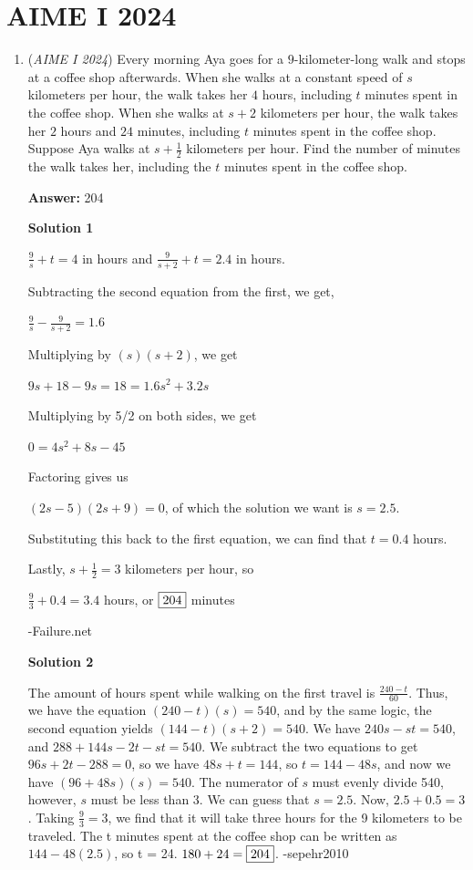 \section{AIME I 2024}
        \begin{enumerate}
        	\item (\textit{AIME I 2024}) Every morning Aya goes for a $9$-kilometer-long walk and stops at a coffee shop afterwards. When she walks at a constant speed of $s$ kilometers per hour, the walk takes her $4$ hours, including $t$ minutes spent in the coffee shop. When she walks at $s + 2$ kilometers per hour, the walk takes her $2$ hours and $24$ minutes, including $t$ minutes spent in the coffee shop. Suppose Aya walks at $s + \frac{1}{2}$
kilometers per hour. Find the number of minutes the walk takes her, including the $t$ minutes spent in the coffee shop.


 
 \textbf{Answer: }204



\textbf{Solution 1}

$\frac{9}{s} + t = 4$ in hours and $\frac{9}{s+2} + t = 2.4$ in hours.

 Subtracting the second equation from the first, we get, 

 $\frac{9}{s} - \frac{9}{s+2} = 1.6$

 Multiplying by $(s)(s+2)$, we get 

 $9s+18-9s=18=1.6s^{2} + 3.2s$

 Multiplying by 5/2 on both sides, we get

 $0 = 4s^{2} + 8s - 45$

 Factoring gives us 

 $(2s-5)(2s+9) = 0$, of which the solution we want is $s=2.5$.

 Substituting this back to the first equation, we can find that $t = 0.4$ hours.

 Lastly, $s + \frac{1}{2} = 3$ kilometers per hour, so

 $\frac{9}{3} + 0.4 = 3.4$ hours, or $\framebox{204}$ minutes

 -Failure.net

 



\textbf{Solution 2}

The amount of hours spent while walking on the first travel is $\frac{240-t}{60}$. Thus, we have the equation $(240-t)(s) = 540$, and by the same logic, the second equation yields $(144-t)(s+2) = 540$. We have $240s-st = 540$, and $288+144s-2t-st = 540$. We subtract the two equations to get $96s+2t-288 = 0$, so we have $48s+t = 144$, so $t = 144-48s$, and now we have $(96+48s)(s) = 540$. The numerator of $s$ must evenly divide 540, however, $s$ must be less than 3. We can guess that $s = 2.5$. Now, $2.5+0.5 = 3$. Taking $\frac{9}{3} = 3$, we find that it will take three hours for the 9 kilometers to be traveled. The t minutes spent at the coffee shop can be written as $144-48(2.5)$, so t = 24. $180 + 24 =  \framebox{204}$. -sepehr2010


\end{enumerate}
